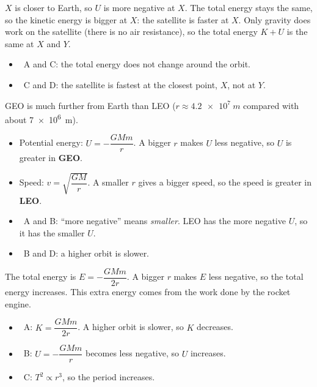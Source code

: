\documentclass[12pt]{article}
\begin{document}
\begin{practiceanswers}
\begin{practiceans}
  $X$ is closer to Earth, so $U$ is more negative at $X$. The total energy stays the same, so the
  kinetic energy is bigger at $X$: the satellite is faster at $X$. Only gravity does work on the
  satellite (there is no air resistance), so the total energy $K + U$ is the same at $X$ and $Y$.
  \begin{itemize}
    \item \xmark\ A and C: the total energy does not change around the orbit.
    \item \xmark\ C and D: the satellite is fastest at the closest point, $X$, not at $Y$.
  \end{itemize}
\end{practiceans}

\begin{practiceans}
  GEO is much further from Earth than LEO ($r \approx \qty{4.2e7}{m}$ compared with about
  \qty{7e6}{m}).
  \begin{itemize}
    \item Potential energy: $U = -\dfrac{GMm}{r}$. A bigger $r$ makes $U$ less negative, so $U$ is
          greater in \textbf{GEO}.
    \item Speed: $v = \sqrt{\dfrac{GM}{r}}$. A smaller $r$ gives a bigger speed, so the speed is
          greater in \textbf{LEO}.
  \end{itemize}
  \begin{itemize}
    \item \xmark\ A and B: “more negative” means \emph{smaller}. LEO has the more negative
          $U$, so it has the smaller $U$.
    \item \xmark\ B and D: a higher orbit is slower.
  \end{itemize}
\end{practiceans}

\begin{practiceans}
  The total energy is $E = -\dfrac{GMm}{2r}$. A bigger $r$ makes $E$ less negative, so the total
  energy increases. This extra energy comes from the work done by the rocket engine.
  \begin{itemize}
    \item \xmark\ A: $K = \dfrac{GMm}{2r}$. A higher orbit is slower, so $K$ decreases.
    \item \xmark\ B: $U = -\dfrac{GMm}{r}$ becomes less negative, so $U$ increases.
    \item \xmark\ C: $T^2 \propto r^3$, so the period increases.
  \end{itemize}
\end{practiceans}


\end{practiceanswers}
\end{document}
